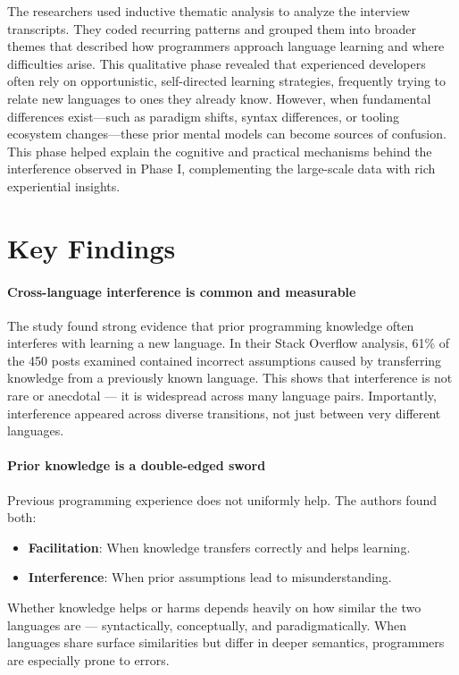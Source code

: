 The researchers used inductive thematic analysis to analyze the interview transcripts. They coded recurring patterns and grouped them into broader themes that described how programmers approach language learning and where difficulties arise. This qualitative phase revealed that experienced developers often rely on opportunistic, self-directed learning strategies, frequently trying to relate new languages to ones they already know. However, when fundamental differences exist—such as paradigm shifts, syntax differences, or tooling ecosystem changes—these prior mental models can become sources of confusion. This phase helped explain the cognitive and practical mechanisms behind the interference observed in Phase I, complementing the large-scale data with rich experiential insights.

\section{Key Findings}
\paragraph{Cross-language interference is common and measurable}
The study found strong evidence that prior programming knowledge often interferes with learning a new language. In their Stack Overflow analysis, 61\% of the 450 posts examined contained incorrect assumptions caused by transferring knowledge from a previously known language. This shows that interference is not rare or anecdotal — it is widespread across many language pairs. Importantly, interference appeared across diverse transitions, not just between very different languages.

\paragraph{Prior knowledge is a double-edged sword}
Previous programming experience does not uniformly help. The authors found both:
\begin{itemize}
    \item \textbf{Facilitation}: When knowledge transfers correctly and helps learning.
    \item \textbf{Interference}: When prior assumptions lead to misunderstanding.
\end{itemize}
Whether knowledge helps or harms depends heavily on how similar the two languages are — syntactically, conceptually, and paradigmatically. When languages share surface similarities but differ in deeper semantics, programmers are especially prone to errors.


